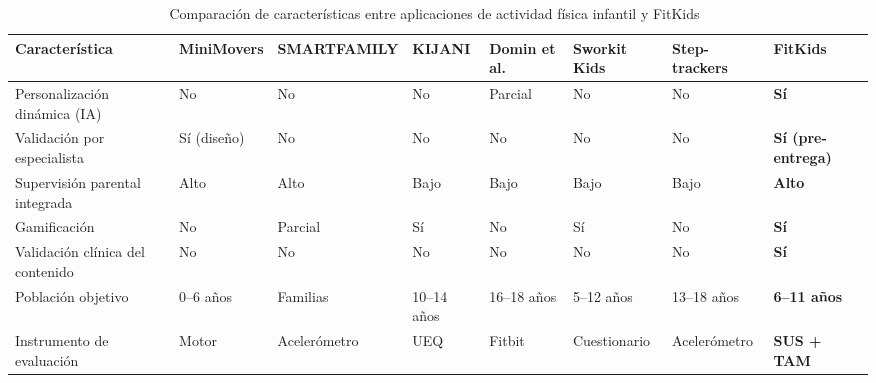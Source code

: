 			\begin{table}[H]
				\centering
				\small
				\caption[Comparación de características entre aplicaciones de actividad física]{Comparación de características entre aplicaciones de actividad física infantil y FitKids~\cite{Zhang2024,Wunsch2024,Willinger2024,Domin2022,Papastergiou2021,GomezCuesta2024,MateoOrcajada2024,Zaleski2026}}
				\label{tab:comparativa_apps}
				\begin{tabular}{p{2.9cm}p{1.2cm}p{1.5cm}p{1.5cm}p{1.5cm}p{1.2cm}p{1.5cm}p{1.9cm}}
					\hline
					\textbf{Característica} & \textbf{Mini\-Movers} & \textbf{SMART\-FAMILY} & \textbf{KIJANI} & \textbf{Domin et al.} & \textbf{Sworkit Kids} & \textbf{Step-trackers} & \textbf{FitKids} \\
					\hline
					Personalización dinámica (IA) & No & No & No & Parcial & No & No & \textbf{Sí} \\
					
					Validación por especialista & Sí (diseño) & No & No & No & No & No & \textbf{Sí (pre-entrega)} \\
					
					Supervisión parental integrada & Alto & Alto & Bajo & Bajo & Bajo & Bajo & \textbf{Alto} \\
					
					Gamificación & No & Parcial & Sí & No & Sí & No & \textbf{Sí} \\
					
					Validación clínica del contenido & No & No & No & No & No & No & \textbf{Sí} \\
					
					Población objetivo & 0--6 años & Familias & 10--14 años & 16--18 años & 5--12 años & 13--18 años & \textbf{6--11 años} \\
					
					Instrumento de evaluación & Motor & Acelerómetro & UEQ & Fitbit & Cuestionario & Acelerómetro & \textbf{SUS + TAM} \\
					\hline
				\end{tabular}
			\end{table}
			\tblnote
			
